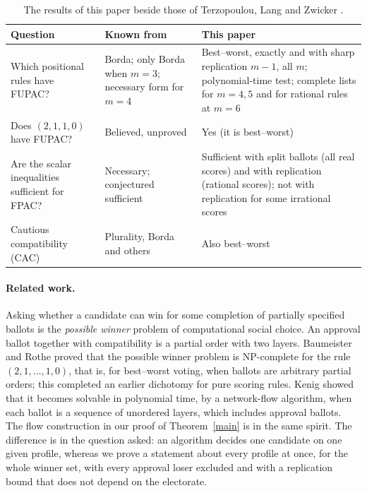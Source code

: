 \documentclass[11pt,a4paper]{article}
\theoremstyle{definition}
\theoremstyle{remark}
\begin{document}
\begin{table}[t]
\centering\small
\begin{tabular}{>{\raggedright}p{}>{\raggedright}p{}>{\raggedright\arraybackslash}p{}}
\toprule
Question & Known from \cite{tlz} & This paper\\
\midrule
Which positional rules have FUPAC? & Borda; only Borda when $m=3$; necessary form for $m=4$ & Best--worst, exactly and with sharp replication $m-1$, all $m$; polynomial-time test; complete lists for $m=4,5$ and for rational rules at $m=6$\\
Does $(2,1,1,0)$ have FUPAC? & Believed, unproved & Yes (it is best--worst)\\
Are the scalar inequalities sufficient for FPAC? & Necessary; conjectured sufficient & Sufficient with split ballots (all real scores) and with replication (rational scores); not with replication for some irrational scores\\
Cautious compatibility (CAC) & Plurality, Borda and others & Also best--worst\\
\bottomrule
\end{tabular}
\caption{The results of this paper beside those of Terzopoulou, Lang and Zwicker \cite{tlz}.}\label{tab:results}
\end{table}

\paragraph{Related work.} Asking whether a candidate can win for some completion of partially specified ballots is the \emph{possible winner} problem of computational social choice. An approval ballot together with compatibility is a partial order with two layers. Baumeister and Rothe \cite{br} proved that the possible winner problem is NP-complete for the rule $(2,1,\ldots,1,0)$, that is, for best--worst voting, when ballots are arbitrary partial orders; this completed an earlier dichotomy for pure scoring rules. Kenig \cite{kenig} showed that it becomes solvable in polynomial time, by a network-flow algorithm, when each ballot is a sequence of unordered layers, which includes approval ballots. The flow construction in our proof of Theorem~\ref{main} is in the same spirit. The difference is in the question asked: an algorithm decides one candidate on one given profile, whereas we prove a statement about every profile at once, for the whole winner set, with every approval loser excluded and with a replication bound that does not depend on the electorate.
\end{document}
